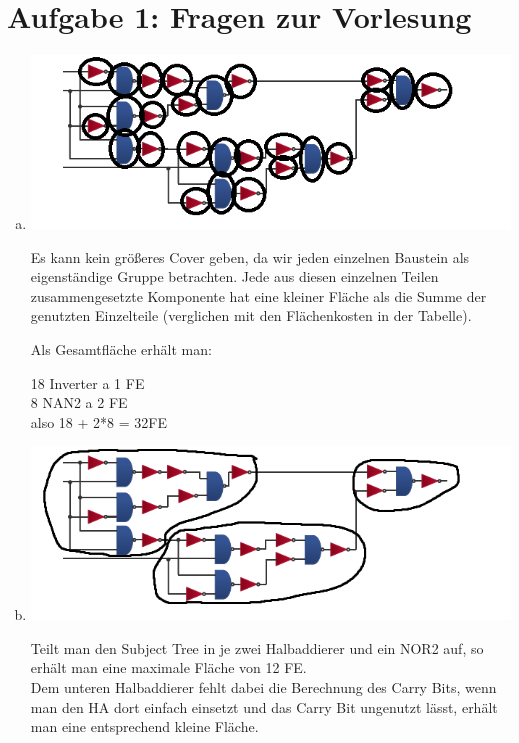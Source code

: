 \documentclass[a4paper]{scrartcl}
\begin{document}
	
	\section*{Aufgabe 1: Fragen zur Vorlesung}
	
	\begin{enumerate}[(a)]
		\item \hfill
		
		\includegraphics[scale=1]{1_subject_tree_max_cover}
		
		Es kann kein größeres Cover geben, da wir jeden einzelnen Baustein als eigenständige Gruppe betrachten. Jede aus diesen einzelnen Teilen zusammengesetzte Komponente hat eine kleiner Fläche als die Summe der genutzten Einzelteile (verglichen mit den Flächenkosten in der Tabelle).
		
		Als Gesamtfläche erhält man:
		
		18 Inverter a 1 FE\\
		8 NAN2 a 2 FE\\
		
		also 18 + 2*8 = 32FE
		
		\item \hfill
		
		\includegraphics[scale=1]{1_subject_tree_12_cover}
		
		Teilt man den Subject Tree in je zwei Halbaddierer und ein NOR2 auf, so erhält man eine maximale Fläche von 12 FE.\\
		
		Dem unteren Halbaddierer fehlt dabei die Berechnung des Carry Bits, wenn man den HA dort einfach einsetzt und das Carry Bit ungenutzt lässt, erhält man eine entsprechend kleine Fläche.
		
	\end{enumerate}
	\newpage
\end{document}
